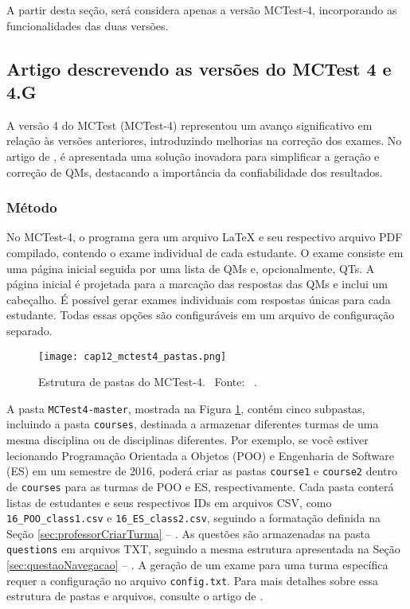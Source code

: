 A partir desta seção, será considera apenas a versão MCTest-4, incorporando as funcionalidades das duas versões.

\subsection{Artigo descrevendo as versões do MCTest 4 e 4.G}

A versão 4 do MCTest (MCTest-4) representou um avanço significativo em relação às versões anteriores, introduzindo melhorias na correção dos exames. No artigo de , é apresentada uma solução inovadora para simplificar a geração e correção de QMs, destacando a importância da confiabilidade dos resultados.

\subsubsection{Método}

No MCTest-4, o programa gera um arquivo \LaTeX{} e seu respectivo arquivo PDF compilado, contendo o exame individual de cada estudante. O exame consiste em uma página inicial seguida por uma lista de QMs e, opcionalmente, QTs. A página inicial é projetada para a marcação das respostas das QMs e inclui um cabeçalho. É possível gerar exames individuais com respostas únicas para cada estudante. Todas essas opções são configuráveis em um arquivo de configuração separado.

\begin{figure}[!ht]
\centering
\texttt{[image: cap12\_mctest4\_pastas.png]}
\caption{Estrutura de pastas do MCTest-4. \ Fonte: \ .}
\label{fig:cap12_mctest4_pastas}
\end{figure}

A pasta \verb|MCTest4-master|, mostrada na Figura \ref{fig:cap12_mctest4_pastas}, contém cinco subpastas, incluindo a pasta \verb|courses|, destinada a armazenar diferentes turmas de uma mesma disciplina ou de disciplinas diferentes. Por exemplo, se você estiver lecionando Programação Orientada a Objetos (POO) e Engenharia de Software (ES) em um semestre de 2016, poderá criar as pastas \verb|course1| e \verb|course2| dentro de \verb|courses| para as turmas de POO e ES, respectivamente. Cada pasta conterá listas de estudantes e seus respectivos IDs em arquivos CSV, como \verb|16_POO_class1.csv| e \verb|16_ES_class2.csv|, seguindo a formatação definida na Seção \ref{sec:professorCriarTurma} -- . As questões são armazenadas na pasta \verb|questions| em arquivos TXT, seguindo a mesma estrutura apresentada na Seção \ref{sec:questaoNavegacao} -- . A geração de um exame para uma turma específica requer a configuração no arquivo \verb|config.txt|. Para mais detalhes sobre essa estrutura de pastas e arquivos, consulte o artigo de .

